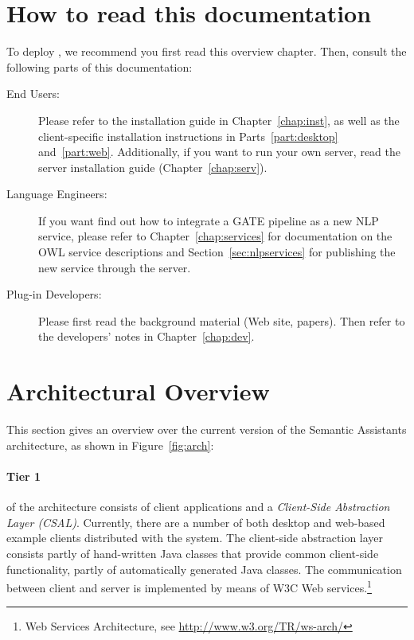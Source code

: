 \section{How to read this documentation}
To deploy \sa, we recommend you first read this overview chapter.
Then, consult the following parts of this documentation:

\begin{description}
\item[End Users:] Please refer to the installation guide in
  Chapter~\ref{chap:inst}, as well as the client-specific installation
  instructions in Parts~\ref{part:desktop}
  and~\ref{part:web}. Additionally, if you want to run your own
  server, read the server installation guide
  (Chapter~\ref{chap:serv}).

\item[Language Engineers:] If you want find out how to integrate a
  GATE pipeline as a new NLP service, please refer to
  Chapter~\ref{chap:services} for documentation on the OWL service
  descriptions and Section~\ref{sec:nlpservices} for publishing the
  new service through the \sa server.

\item[Plug-in Developers:] Please first read the background material
  (Web site, papers). Then refer to the developers' notes in
  Chapter~\ref{chap:dev}.
\end{description}

\section{Architectural Overview}
\label{sec:implementation}
This section gives an overview over the current version of the Semantic
Assistants architecture, as shown in Figure~\ref{fig:arch}:

\paragraph{Tier 1} of the architecture consists of client applications
and a \emph{Client-Side Abstraction Layer (CSAL)}. Currently, there
are a number of both desktop and web-based example clients distributed with the system. The client-side abstraction
layer consists partly of hand-written Java classes that provide
common client-side functionality, partly of automatically generated
Java classes. The communication between client and server is
implemented by means of W3C Web services.\footnote{Web Services Architecture, see
  \url{http://www.w3.org/TR/ws-arch/}} 

